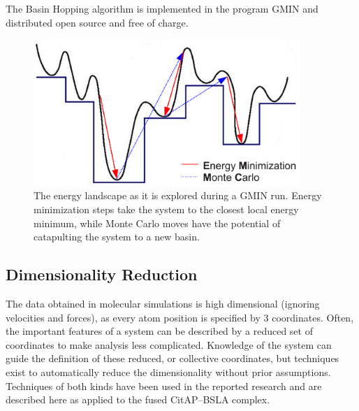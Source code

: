 \documentclass[english, a4paper, 12pt, titlepage, draft]{article}
\begin{document}
The Basin Hopping algorithm is implemented in the program GMIN \cite{GMIN} and distributed open source and free of charge.

\begin{figure}
    \centering
    \includegraphics[width=0.9\textwidth]{figures/GMIN/GMIN.pdf}
    \caption{The energy landscape as it is explored during a GMIN run. Energy minimization steps take the system to the closest local energy minimum, while Monte Carlo moves have the potential of catapulting the system to a new basin.}
    \label{fig:GMIN}
\end{figure}        




\subsection{Dimensionality Reduction}
\label{sec:DimRed}

The data obtained in molecular simulations is high dimensional (ignoring velocities and forces), as every atom position is specified by 3 coordinates.
Often, the important features of a system can be described by a reduced set of coordinates to make analysis less complicated.
Knowledge of the system can guide the definition of these reduced, or collective coordinates, but techniques exist to automatically reduce the dimensionality without prior assumptions.
Techniques of both kinds have been used in the reported research and are described here as applied to the fused CitAP--BSLA complex.
\end{document}
